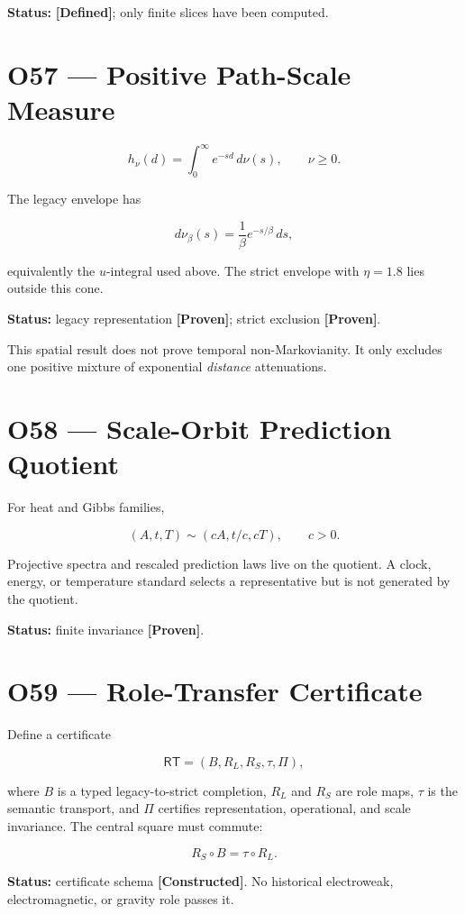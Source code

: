 \documentclass[11pt,a4paper,openany]{report}
\newcommand{\statusProven}{\textcolor{fingreen}{[Proven]}}
\begin{document}
\textbf{Status:} \textbf{[Defined]}; only finite slices have been computed.

\section{O57 --- Positive Path-Scale Measure}

\[
h_\nu(d)=\int_0^\infty e^{-sd}\,d\nu(s),
\qquad \nu\ge0.
\]

The legacy envelope has

\[
d\nu_\beta(s)
=
\frac{1}{\beta}e^{-s/\beta}\,ds,
\]

equivalently the \(u\)-integral used above. The strict envelope with \(\eta=1.8\) lies outside this cone.

\textbf{Status:} legacy representation \textbf{\statusProven{}}; strict exclusion \textbf{\statusProven{}}.

This spatial result does not prove temporal non-Markovianity. It only excludes one positive mixture of exponential \emph{distance} attenuations.

\section{O58 --- Scale-Orbit Prediction Quotient}

For heat and Gibbs families,

\[
(A,t,T)\sim(cA,t/c,cT),\qquad c>0.
\]

Projective spectra and rescaled prediction laws live on the quotient. A clock, energy, or temperature standard selects a representative but is not generated by the quotient.

\textbf{Status:} finite invariance \textbf{\statusProven{}}.

\section{O59 --- Role-Transfer Certificate}

Define a certificate

\[
\mathsf{RT}
=
(B,R_L,R_S,\tau,\Pi),
\]

where \(B\) is a typed legacy-to-strict completion, \(R_L\) and \(R_S\) are role maps, \(\tau\) is the semantic transport, and \(\Pi\) certifies representation, operational, and scale invariance. The central square must commute:

\[
R_S\circ B=\tau\circ R_L.
\]

\textbf{Status:} certificate schema \textbf{[Constructed]}. No historical electroweak, electromagnetic, or gravity role passes it.
\end{document}
